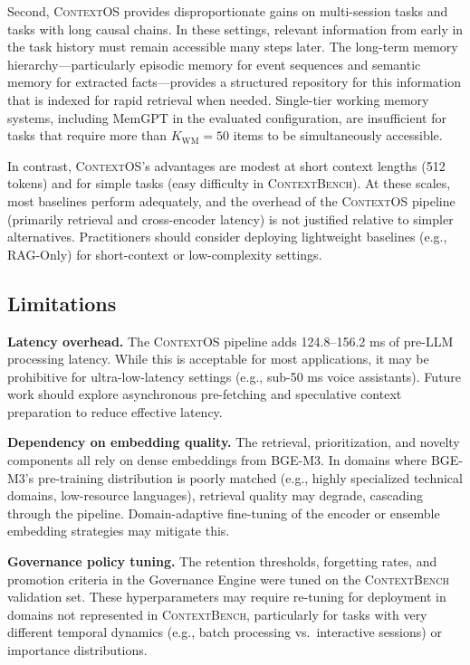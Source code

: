 \documentclass[review,12pt]{elsarticle}
\newcommand{\contextos}{\textsc{ContextOS}}
\newcommand{\contextbench}{\textsc{ContextBench}}
\begin{document}
Second, \contextos{} provides disproportionate gains on multi-session tasks
and tasks with long causal chains.  In these settings, relevant information
from early in the task history must remain accessible many steps later.
The long-term memory hierarchy—particularly episodic memory for event sequences
and semantic memory for extracted facts—provides a structured repository for
this information that is indexed for rapid retrieval when needed.  Single-tier
working memory systems, including MemGPT in the evaluated configuration, are
insufficient for tasks that require more than $K_{\text{WM}} = 50$ items to be
simultaneously accessible.

In contrast, \contextos{}'s advantages are modest at short context lengths
(512 tokens) and for simple tasks (easy difficulty in \contextbench{}).  At
these scales, most baselines perform adequately, and the overhead of the
\contextos{} pipeline (primarily retrieval and cross-encoder latency) is not
justified relative to simpler alternatives.  Practitioners should consider
deploying lightweight baselines (e.g., RAG-Only) for short-context or
low-complexity settings.

\subsection{Limitations}
\label{subsec:limitations}

\textbf{Latency overhead.}  The \contextos{} pipeline adds 124.8--156.2 ms
of pre-LLM processing latency.  While this is acceptable for most applications,
it may be prohibitive for ultra-low-latency settings (e.g., sub-50 ms
voice assistants).  Future work should explore asynchronous pre-fetching and
speculative context preparation to reduce effective latency.

\textbf{Dependency on embedding quality.}  The retrieval, prioritization, and
novelty components all rely on dense embeddings from BGE-M3.  In domains where
BGE-M3's pre-training distribution is poorly matched (e.g., highly specialized
technical domains, low-resource languages), retrieval quality may degrade,
cascading through the pipeline.  Domain-adaptive fine-tuning of the encoder
or ensemble embedding strategies may mitigate this.

\textbf{Governance policy tuning.}  The retention thresholds, forgetting rates,
and promotion criteria in the Governance Engine were tuned on the \contextbench{}
validation set.  These hyperparameters may require re-tuning for deployment
in domains not represented in \contextbench{}, particularly for tasks with
very different temporal dynamics (e.g., batch processing vs.\ interactive
sessions) or importance distributions.
\end{document}

